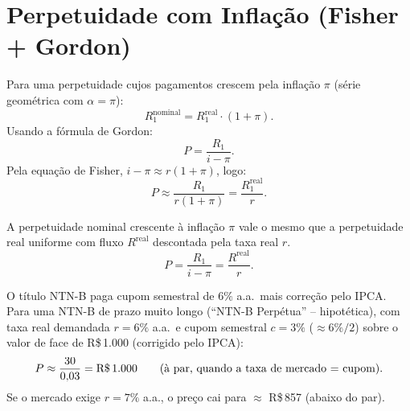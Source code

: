 \section{Perpetuidade com Inflação (Fisher + Gordon)}

Para uma perpetuidade cujos pagamentos crescem pela inflação $\pi$ (série geométrica
com $\alpha = \pi$):
\[
  R_1^{\text{nominal}} = R_1^{\text{real}} \cdot (1+\pi).
\]
Usando a fórmula de Gordon:
\[
  P = \frac{R_1}{i - \pi}.
\]
Pela equação de Fisher, $i - \pi \approx r(1+\pi)$, logo:
\[
  P \approx \frac{R_1}{r(1+\pi)} = \frac{R_1^{\text{real}}}{r}.
\]

\begin{resultado}
A perpetuidade nominal crescente à inflação $\pi$ vale o mesmo que a perpetuidade
real uniforme com fluxo $R^{\text{real}}$ descontada pela taxa real $r$.
\[
  P = \frac{R_1}{i-\pi} = \frac{R^{\text{real}}}{r}.
\]
\end{resultado}

\newpage

\begin{moderno}[title={Tesouro IPCA+ como perpetuidade real (2025)}]
O título NTN-B paga cupom semestral de $6\%$ a.a.\ mais correção pelo IPCA.
Para uma NTN-B de prazo muito longo (``NTN-B Perpétua'' -- hipotética), com
taxa real demandada $r = 6\%$ a.a.\ e cupom semestral $c = 3\%$ ($\approx 6\%/2$) sobre
o valor de face de R\$\,1.000 (corrigido pelo IPCA):
\[
  P \approx \frac{30}{0{,}03} = \text{R\$\,}1{.}000
  \qquad\text{(à par, quando a taxa de mercado = cupom).}
\]
Se o mercado exige $r = 7\%$ a.a., o preço cai para $\approx$ R\$\,857 (abaixo do par).
\end{moderno}
